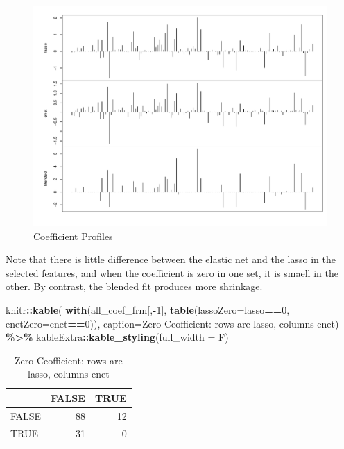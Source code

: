 \documentclass[
]{book}
\newenvironment{Shaded}{\begin{snugshade}}{\end{snugshade}}
\newcommand{\DataTypeTok}[1]{\textcolor[rgb]{0.13,0.29,0.53}{#1}}
\newcommand{\DecValTok}[1]{\textcolor[rgb]{0.00,0.00,0.81}{#1}}
\newcommand{\KeywordTok}[1]{\textcolor[rgb]{0.13,0.29,0.53}{\textbf{#1}}}
\newcommand{\NormalTok}[1]{#1}
\newcommand{\OperatorTok}[1]{\textcolor[rgb]{0.81,0.36,0.00}{\textbf{#1}}}
\newcommand{\StringTok}[1]{\textcolor[rgb]{0.31,0.60,0.02}{#1}}
\begin{document}
\begin{figure}
\centering
\includegraphics{Static/figures/compCoeffProf-1.pdf}
\caption{\label{fig:compCoeffProf}Coefficient Profiles}
\end{figure}

Note that there is little difference between the elastic net and the lasso
in the selected features, and when the coefficient is zero in one set, it
is smaell in the other. By contrast, the blended fit produces more shrinkage.

\begin{Shaded}
\begin{Highlighting}[]
\NormalTok{knitr}\OperatorTok{::}\KeywordTok{kable}\NormalTok{(}
\KeywordTok{with}\NormalTok{(all\_coef\_frm[,}\OperatorTok{{-}}\DecValTok{1}\NormalTok{], }\KeywordTok{table}\NormalTok{(}\DataTypeTok{lassoZero=}\NormalTok{lasso}\OperatorTok{==}\DecValTok{0}\NormalTok{, }\DataTypeTok{enetZero=}\NormalTok{enet}\OperatorTok{==}\DecValTok{0}\NormalTok{)),}
 \DataTypeTok{caption=}\StringTok{\textquotesingle{}Zero Ceofficient: rows are lasso, columns enet\textquotesingle{}}\NormalTok{) }\OperatorTok{\%>\%}
\StringTok{  }\NormalTok{kableExtra}\OperatorTok{::}\KeywordTok{kable\_styling}\NormalTok{(}\DataTypeTok{full\_width =}\NormalTok{ F)}
\end{Highlighting}
\end{Shaded}

\begin{table}

\caption{\label{tab:zreros}Zero Ceofficient: rows are lasso, columns enet}
\centering
\begin{tabular}[t]{l|r|r}
\hline
  & FALSE & TRUE\\
\hline
FALSE & 88 & 12\\
\hline
TRUE & 31 & 0\\
\hline
\end{tabular}
\end{table}
\end{document}
